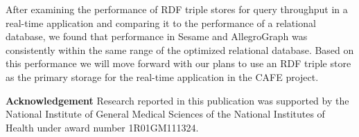 \documentclass{llncs}
\begin{document}
After examining the performance of RDF triple stores for query throughput in a real-time application and comparing it to the performance of a relational database, we found that performance in Sesame and AllegroGraph was consistently within the same range of the optimized relational database.
Based on this performance we will move forward with our plans to use an RDF triple store as the primary storage for the real-time application in the CAFE project.

\medskip
\noindent
\textbf{Acknowledgement} Research reported in this publication was supported by the National Institute of General Medical Sciences of the National Institutes of Health under award number 1R01GM111324.
\vspace{-1em}


\end{document}
